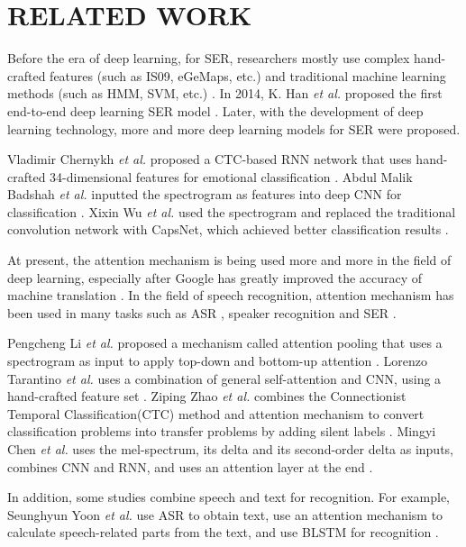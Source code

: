 \documentclass[10pt, conference, compsocconf]{IEEEtran}
\begin{document}
\section{RELATED WORK}
Before the era of deep learning, for SER, researchers mostly use complex hand-crafted features (such as IS09, eGeMaps, etc.) and traditional machine learning methods (such as HMM, SVM, etc.) \cite{schuller2003hidden,mower2010framework}. In 2014, K. Han \emph{et al.} proposed the first end-to-end deep learning SER model \cite{han2014speech}. Later, with the development of deep learning technology, more and more deep learning models for SER were proposed.

Vladimir Chernykh \emph{et al.} proposed a CTC-based RNN network that uses hand-crafted 34-dimensional features for emotional classification \cite{chernykh2017emotion}. Abdul Malik Badshah \emph{et al.} inputted the spectrogram as features into deep CNN for classification \cite{badshah2017speech}. Xixin Wu \emph{et al.} used the spectrogram and replaced the traditional convolution network with CapsNet, which achieved better classification results \cite{wu2019speech}. 

At present, the attention mechanism is being used more and more in the field of deep learning, especially after Google has greatly improved the accuracy of machine translation \cite{vaswani2017attention}. In the field of speech recognition, attention mechanism has been used in many tasks such as ASR \cite{pham2019very}, speaker recognition \cite{india2019self} and SER \cite{li2018attention,tarantino2019self,zhao2019attention,chen20183}.

Pengcheng Li \emph{et al.} proposed a mechanism called attention pooling that uses a spectrogram as input to apply top-down and bottom-up attention \cite{li2018attention}. Lorenzo Tarantino \emph{et al.} uses a combination of general self-attention and CNN, using a hand-crafted feature set \cite{tarantino2019self}. Ziping Zhao \emph{et al.} combines the Connectionist Temporal Classification(CTC) method and attention mechanism to convert classification problems into transfer problems by adding silent labels \cite{zhao2019attention}. Mingyi Chen \emph{et al.} uses the mel-spectrum, its delta and its second-order delta as inputs, combines CNN and RNN, and uses an attention layer at the end \cite{chen20183}.

In addition, some studies combine speech and text for recognition. For example, Seunghyun Yoon \emph{et al.} use ASR to obtain text, use an attention mechanism to calculate speech-related parts from the text, and use BLSTM for recognition \cite{yoon2019speech}.
\end{document}
